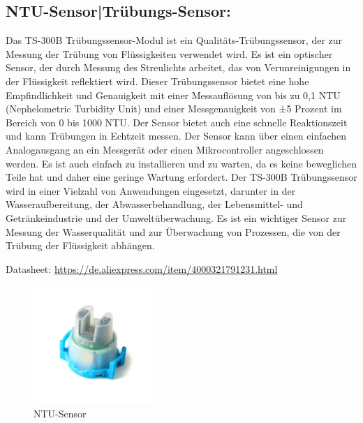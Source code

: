 \subsection*{NTU-Sensor|Trübungs-Sensor:}
Das TS-300B Trübungssensor-Modul ist ein Qualitäts-Trübungssensor, der zur Messung der Trübung von Flüssigkeiten verwendet wird. 
Es ist ein optischer Sensor, der durch Messung des Streulichts arbeitet, das von Verunreinigungen in der Flüssigkeit reflektiert wird.  
Dieser Trübungssensor bietet eine hohe Empfindlichkeit und Genauigkeit mit einer Messauflösung von bis zu 0,1 NTU (Nephelometric Turbidity Unit) und einer Messgenauigkeit von ±5 Prozent im Bereich von 0 bis 1000 NTU. 
Der Sensor bietet auch eine schnelle Reaktionszeit und kann Trübungen in Echtzeit messen. Der Sensor kann über einen einfachen Analogausgang an ein Messgerät oder einen Mikrocontroller angeschlossen werden. Es ist auch einfach zu installieren und zu warten, da es keine beweglichen Teile hat und daher eine geringe Wartung erfordert. 
Der TS-300B Trübungssensor wird in einer Vielzahl von Anwendungen eingesetzt, darunter in der Wasseraufbereitung, der Abwasserbehandlung, der Lebensmittel- und Getränkeindustrie und der Umweltüberwachung. Es ist ein wichtiger Sensor zur Messung der Wasserqualität und zur Überwachung von Prozessen, die von der Trübung der Flüssigkeit abhängen. 


Datasheet: \url{https://de.aliexpress.com/item/4000321791231.html}

\begin{figure}[b]
    \centering
    \includegraphics[width=0.4\textwidth]{./pics/ntuSensorBild.jpeg}
    \caption{NTU-Sensor}
    \label{fig:NTU-Sensor}
\end{figure}
\cite{NTU-Sensor}


\newpage
